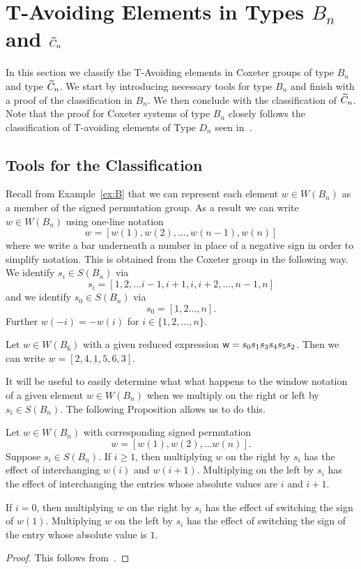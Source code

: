 \chapter{T-Avoiding Elements in Types $B_n$ and $\widetilde{C}_n$}

In this section we classify the T-Avoiding elements in Coxeter groups of type $B_n$ and type $\widetilde{C}_n$. We start by introducing necessary tools for type $B_n$ and finish with a proof of the classification in $B_n$. We then conclude with the classification of $\widetilde{C}_n$. Note that the proof for Coxeter systems of type $B_n$ closely follows the classification of T-avoiding elements of Type $D_n$ seen in~\cite{Gern2013a}.

\section{Tools for the Classification}

Recall from Example~\ref{ex:B} that we can represent each element $w \in W(B_n)$ as a member of the signed permutation group. As a result we can write $w \in W(B_n)$ using one-line notation 
\[ w=[w(1),w(2), \ldots, w(n-1), w(n)] \]
where we write a bar underneath a number in place of a negative sign in order to simplify notation. This is obtained from the Coxeter group in the following way. We identify $s_i \in S(B_n)$ via 
\[s_i=[1,2, \ldots i-1, i+1,i,i+2, \ldots, n-1,n] \] and we identify $s_0 \in S(B_n)$ via
\[s_0=[\underbar{1}, 2 \ldots, n].\] Further $w(-i)=-w(i)$ for $i \in \{1,2, \ldots, n\}$.

\begin{example}
Let $w \in W(B_6)$ with a given reduced expression $\mathsf{w}=s_0s_1s_3s_4s_5s_2$. Then we can write $w=[2, 4, \underbar{1}, 5, 6, 3]$. 
\end{example}

It will be useful to easily determine what what happens to the window notation of a given element $w \in W(B_n)$ when we multiply on the right or left by $s_i \in S(B_n)$. The following Proposition allows us to do this.

\begin{proposition}
	Let $w \in W(B_n)$ with corresponding signed permutation 
	\[w=[w(1),w(2), \ldots w(n)].\]
	Suppose $s_i \in S(B_n)$. If $i \geq 1$, then multiplying $w$ on the right by $s_i$ has the effect of interchanging $w(i)$ and $w(i+1)$. Multiplying on the left by $s_i$ has the effect of interchanging the entries whose absolute values are $i$ and $i+1$.
	
	If $i=0$, then multiplying $w$ on the right by $s_i$ has the effect of switching the sign of $w(1)$. Multiplying $w$ on the left by $s_i$ has the effect of switching the sign of the entry whose absolute value is $1$.
	\begin{proof}
	This follows from~\cite[Section 8.1 and A3.1]{Bjorner2005}.	
	\end{proof}
\end{proposition}

